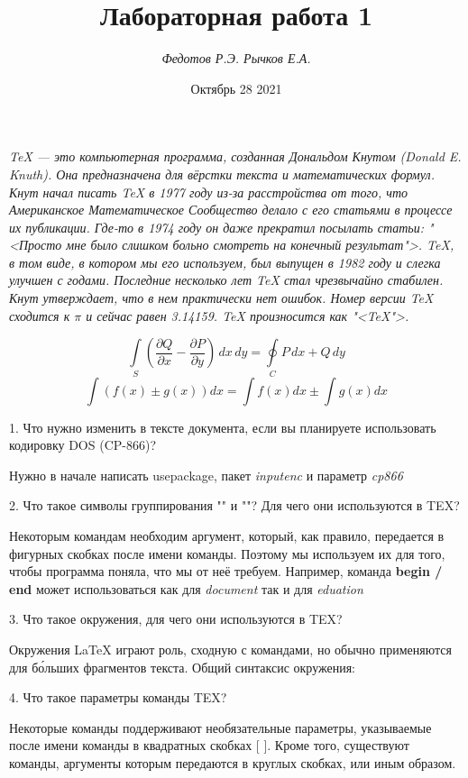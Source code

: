 \documentclass{article}
\title{Лабораторная работа 1}
\author{\textit{Федотов Р.Э. Рычков Е.А.}}
\date{Октябрь 28 2021}
\begin{document}
\maketitle


\textit{\TeX{} --- это компьютерная программа, созданная Дональдом Кнутом (Donald E. Knuth). Она предназначена для вёрстки текста и математических формул. Кнут начал писать TeX в 1977 году из-за расстройства от того, что Американское Математическое Сообщество делало с его статьями в процессе их публикации. Где-то в 1974 году он даже прекратил посылать статьи: "<Просто мне было слишком больно смотреть на конечный результат">. \TeX{}, в том виде, в котором мы его используем, был выпущен в 1982 году и слегка улучшен с годами. Последние несколько лет \TeX{} стал чрезвычайно стабилен. Кнут утверждает, что в нем практически нет ошибок. Номер версии \TeX{} сходится к $\pi$ и сейчас равен 3.14159. \TeX{} произносится как "<\TeX{}">.}

\begin{equation}
\int \limits_S \left( \frac{\partial Q}{\partial x} - \frac{\partial P}{\partial y} \right)\, dx \, dy =\oint \limits_C P\,dx + Q \, dy
\end{equation}
\begin{equation}
\int \left ( f(x) \pm g(x)\right )dx=\int f(x)dx \pm \int g(x)dx
\end{equation}

1. Что нужно изменить в тексте документа, если вы планируете использовать кодировку DOS (CP-866)?

Нужно в начале написать usepackage, пакет \textit{inputenc} и параметр \textit{cp866}

2. Что такое символы группирования "{" и "}"? Для чего они используются в TEX?

Некоторым командам необходим аргумент, который, как правило, передается в фигурных скобках { } после имени команды. Поэтому мы используем их для того, чтобы программа поняла, что мы от неё требуем. Например, команда \textbf{begin / end} может использоваться как для \textit{document} так и для \textit{eduation}

3. Что такое окружения, для чего они используются в TEX?

Окружения LaTeX играют роль, сходную с командами, но обычно применяются для бо́льших фрагментов текста. Общий синтаксис окружения:

4. Что такое параметры команды TEX?

Некоторые команды поддерживают необязательные параметры, указываемые после имени команды в квадратных скобках [ ]. Кроме того, существуют команды, аргументы которым передаются в круглых скобках, или иным образом.
\end{document}
